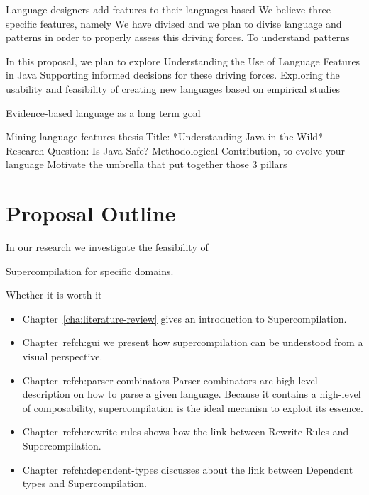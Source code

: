 Language designers add features to their languages based
We believe
three specific features, namely
We have divised and we plan to divise language and \api{} patterns in order to properly assess this driving forces.
To understand patterns

In this proposal, we plan to explore
Understanding the Use of Language Features in Java
Supporting informed decisions for these driving forces.
Exploring the usability and feasibility of creating new languages based on empirical studies



Evidence-based language as a long term goal

Mining language features thesis
Title: *Understanding Java in the Wild*
Research Question: Is Java Safe?
Methodological Contribution, to evolve your language
Motivate the umbrella that put together those 3 pillars





\section{Proposal Outline}

In our research we investigate the feasibility of 

Supercompilation for specific domains.

Whether it is worth it

\begin{itemize}

\item Chapter~\ref{cha:literature-review} gives an introduction to Supercompilation.

\item Chapter~ref{ch:gui} we present how supercompilation can be understood from a visual perspective.

\item Chapter~ref{ch:parser-combinators} Parser combinators are high level description on how to parse a given language.
Because it contains a high-level of composability, supercompilation is the ideal mecanisn to exploit its essence.

\item Chapter~ref{ch:rewrite-rules} shows how the link between Rewrite Rules and Supercompilation.

\item Chapter~ref{ch:dependent-types} discusses about the link between Dependent types and Supercompilation.

\end{itemize}


